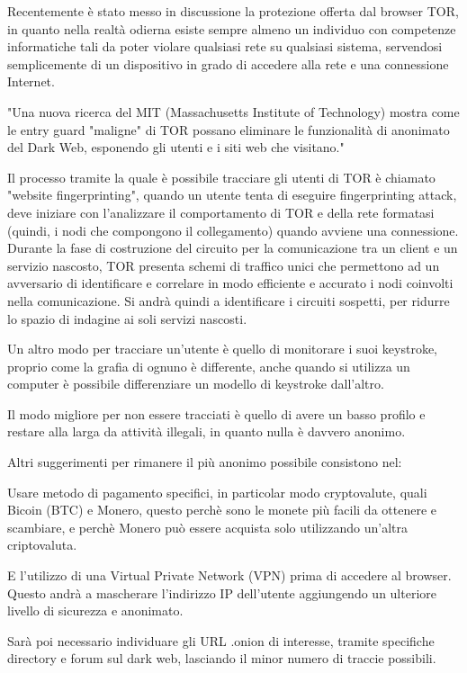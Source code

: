 Recentemente è stato messo in discussione la protezione offerta dal browser TOR, in quanto nella realtà odierna esiste sempre almeno un individuo con competenze informatiche tali da poter violare qualsiasi rete su qualsiasi sistema, servendosi semplicemente di un dispositivo in grado di accedere alla rete e una connessione Internet.

"Una nuova ricerca del MIT (Massachusetts Institute of Technology) mostra come le entry guard "maligne" di TOR possano eliminare le funzionalità di anonimato del Dark Web, esponendo gli utenti e i siti web che visitano."

Il processo tramite la quale è possibile tracciare gli utenti di TOR è chiamato "website fingerprinting", quando un utente tenta di eseguire fingerprinting attack, deve iniziare con l'analizzare il comportamento di TOR  e della rete formatasi (quindi, i nodi che compongono il collegamento) quando avviene una connessione. Durante la fase di costruzione del circuito per la comunicazione tra un client e un servizio nascosto, TOR presenta schemi di traffico unici che permettono ad un avversario di identificare e correlare in modo efficiente e accurato i nodi coinvolti nella comunicazione.
Si andrà quindi a identificare i circuiti sospetti, per ridurre lo spazio di indagine ai soli servizi nascosti.

Un altro modo per tracciare un'utente è quello di monitorare i suoi keystroke, proprio come la grafia di ognuno è differente, anche quando si utilizza un computer è possibile differenziare un modello di keystroke dall'altro.

Il modo migliore per non essere tracciati è quello di avere un basso profilo e restare alla larga da attività illegali, in quanto nulla è davvero anonimo.

\newpage

Altri suggerimenti per rimanere il più anonimo possibile consistono nel:

Usare metodo di pagamento specifici, in particolar modo cryptovalute, quali Bicoin (BTC) e Monero, questo perchè sono le monete più facili da ottenere e scambiare, e perchè Monero può essere acquista solo utilizzando un'altra criptovaluta. 

E l'utilizzo di una Virtual Private Network (VPN) prima di accedere al browser. Questo andrà a mascherare l'indirizzo IP dell'utente aggiungendo un ulteriore livello di sicurezza e anonimato.

Sarà poi necessario individuare gli URL .onion di interesse, tramite specifiche directory e forum sul dark web, lasciando il minor numero di traccie possibili.

